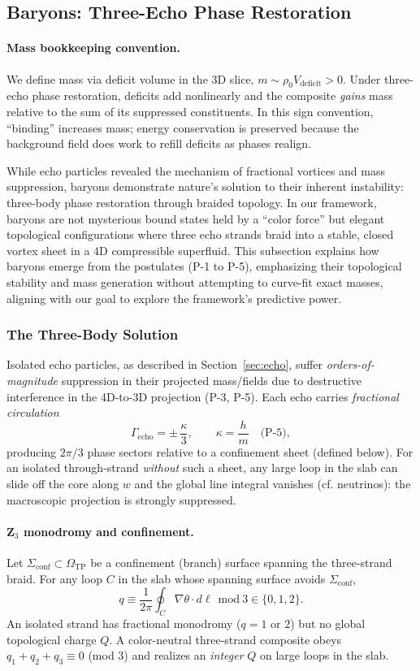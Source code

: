 \subsection{Baryons: Three-Echo Phase Restoration}
\label{sec:baryons}
 \paragraph{Mass bookkeeping convention.} We define mass via deficit volume in the 3D slice, $m\sim \rho_0 V_{\text{deficit}}>0$. Under three-echo phase restoration, deficits add nonlinearly and the composite \emph{gains} mass relative to the sum of its suppressed constituents. In this sign convention, ``binding'' increases mass; energy conservation is preserved because the background field does work to refill deficits as phases realign.

While echo particles revealed the mechanism of fractional vortices and mass suppression, baryons demonstrate nature's solution to their inherent instability: three-body phase restoration through braided topology. In our framework, baryons are not mysterious bound states held by a ``color force'' but elegant topological configurations where three echo strands braid into a stable, closed vortex sheet in a 4D compressible superfluid. This subsection explains how baryons emerge from the postulates (P-1 to P-5), emphasizing their topological stability and mass generation without attempting to curve-fit exact masses, aligning with our goal to explore the framework's predictive power.

\subsubsection{The Three-Body Solution}

Isolated echo particles, as described in Section~\ref{sec:echo}, suffer \emph{orders-of-magnitude} suppression in their projected mass/fields due to destructive interference in the 4D-to-3D projection (P-3, P-5). Each echo carries \emph{fractional circulation}
\[
\Gamma_{\text{echo}}=\pm\,\frac{\kappa}{3},\qquad \kappa=\frac{h}{m}\quad\text{(P-5)},
\]
producing $2\pi/3$ phase sectors relative to a confinement sheet (defined below). For an isolated through-strand \emph{without} such a sheet, any large loop in the slab can slide off the core along $w$ and the global line integral vanishes (cf. neutrinos): the macroscopic projection is strongly suppressed.

\paragraph{Z$_3$ monodromy and confinement.}
Let $\Sigma_{\mathrm{conf}}\subset\Omega_{\mathrm{TP}}$ be a confinement (branch) surface spanning the three-strand braid. For any loop $C$ in the slab whose spanning surface avoids $\Sigma_{\mathrm{conf}}$,
\[
q \equiv \frac{1}{2\pi}\oint_C \nabla\theta\cdot d\boldsymbol\ell \ \ \mathrm{mod}\ 3\in\{0,1,2\}.
\]
An isolated strand has fractional monodromy ($q=1$ or $2$) but no global topological charge $Q$. A color-neutral three-strand composite obeys $q_1+q_2+q_3\equiv0$ (mod 3) and realizes an \emph{integer} $Q$ on large loops in the slab.

